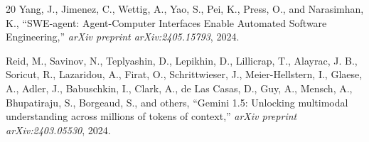 \documentclass[conference]{IEEEtran}
\begin{document}
\begin{thebibliography}{20}
Yang, J., Jimenez, C., Wettig, A., Yao, S., Pei, K., Press, O., and Narasimhan, K., ``SWE-agent: Agent-Computer Interfaces Enable Automated Software Engineering,'' \textit{arXiv preprint arXiv:2405.15793}, 2024.

Reid, M., Savinov, N., Teplyashin, D., Lepikhin, D., Lillicrap, T., Alayrac, J. B., Soricut, R., Lazaridou, A., Firat, O., Schrittwieser, J., Meier-Hellstern, I., Glaese, A., Adler, J., Babuschkin, I., Clark, A., de Las Casas, D., Guy, A., Mensch, A., Bhupatiraju, S., Borgeaud, S., and others, ``Gemini 1.5: Unlocking multimodal understanding across millions of tokens of context,'' \textit{arXiv preprint arXiv:2403.05530}, 2024.

\end{thebibliography}
\end{document}
